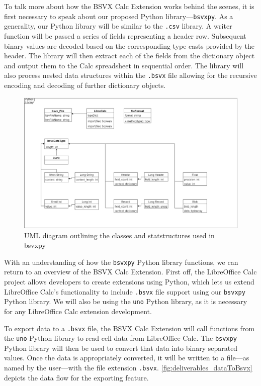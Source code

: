 \documentclass[10pt]{article}
\begin{document}
\indent{}
To talk more about how the BSVX Calc Extension works behind the scenes, it is first necessary to speak about our proposed Python library---\texttt{bsvxpy}.
As a generality, our Python library will be similar to the \texttt{.csv} library.
A writer function will be passed a series of fields representing a header row. 
Subsequent binary values are decoded based on the corresponding type casts provided by the header.
The library will then extract each of the fields from the dictionary object and output them to the Calc spreadsheet in sequential order.
The library will also process nested data structures within the \texttt{.bsvx} file allowing for the recursive encoding and decoding of further dictionary objects.

\begin{figure}[H]
\centering
\includegraphics[width=\textwidth]{figures/bsvxpy.png}
\caption{UML diagram outlining the classes and statstructures used in bsvxpy}
\label{fig:bsvxpy_architecture}
\end{figure}


\indent{}
With an understanding of how the \texttt{bsvxpy} Python library functions, we can return to an overview of the BSVX Calc Extension.
First off, the LibreOffice Calc project allows developers to create extensions using Python, which lets us extend LibreOffice Calc’s functionality to include \texttt{.bsvx} file support using our \texttt{bsvxpy} Python library.
We will also be using the \texttt{uno} Python library, as it is necessary for any LibreOffice Calc extension development.

\indent{}
To export data to a \texttt{.bsvx} file, the BSVX Calc Extension will call functions from the \texttt{uno} Python library to read cell data from LibreOffice Calc.
The \texttt{bsvxpy} Python library will then be used to convert that data into binary separated values.
Once the data is appropriately converted, it will be written to a file---as named by the user---with the file extension \texttt{.bsvx}.
\autoref{fig:deliverables_dataToBsvx} depicts the data flow for the exporting feature.
\end{document}

